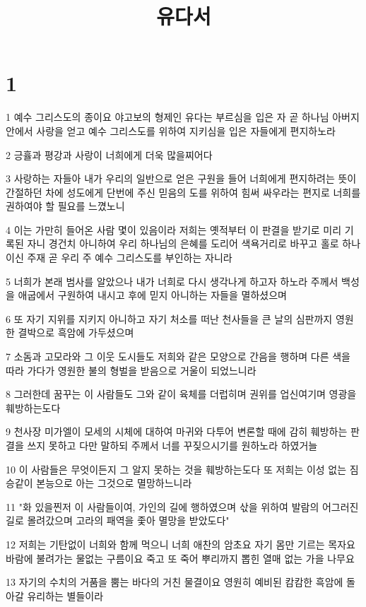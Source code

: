 

\title{유다서}


\chapter{1}

\par 1 예수 그리스도의 종이요 야고보의 형제인 유다는 부르심을 입은 자 곧 하나님 아버지 안에서 사랑을 얻고 예수 그리스도를 위하여 지키심을 입은 자들에게 편지하노라
\par 2 긍휼과 평강과 사랑이 너희에게 더욱 많을찌어다
\par 3 사랑하는 자들아 내가 우리의 일반으로 얻은 구원을 들어 너희에게 편지하려는 뜻이 간절하던 차에 성도에게 단번에 주신 믿음의 도를 위하여 힘써 싸우라는 편지로 너희를 권하여야 할 필요를 느꼈노니
\par 4 이는 가만히 들어온 사람 몇이 있음이라 저희는 옛적부터 이 판결을 받기로 미리 기록된 자니 경건치 아니하여 우리 하나님의 은혜를 도리어 색욕거리로 바꾸고 홀로 하나이신 주재 곧 우리 주 예수 그리스도를 부인하는 자니라
\par 5 너희가 본래 범사를 알았으나 내가 너희로 다시 생각나게 하고자 하노라 주께서 백성을 애굽에서 구원하여 내시고 후에 믿지 아니하는 자들을 멸하셨으며
\par 6 또 자기 지위를 지키지 아니하고 자기 처소를 떠난 천사들을 큰 날의 심판까지 영원한 결박으로 흑암에 가두셨으며
\par 7 소돔과 고모라와 그 이웃 도시들도 저희와 같은 모양으로 간음을 행하며 다른 색을 따라 가다가 영원한 불의 형벌을 받음으로 거울이 되었느니라
\par 8 그러한데 꿈꾸는 이 사람들도 그와 같이 육체를 더럽히며 권위를 업신여기며 영광을 훼방하는도다
\par 9 천사장 미가엘이 모세의 시체에 대하여 마귀와 다투어 변론할 때에 감히 훼방하는 판결을 쓰지 못하고 다만 말하되 주께서 너를 꾸짖으시기를 원하노라 하였거늘
\par 10 이 사람들은 무엇이든지 그 알지 못하는 것을 훼방하는도다 또 저희는 이성 없는 짐승같이 본능으로 아는 그것으로 멸망하느니라
\par 11 "화 있을찐저 이 사람들이여, 가인의 길에 행하였으며 삯을 위하여 발람의 어그러진 길로 몰려갔으며 고라의 패역을 좇아 멸망을 받았도다"
\par 12 저희는 기탄없이 너희와 함께 먹으니 너희 애찬의 암초요 자기 몸만 기르는 목자요 바람에 불려가는 물없는 구름이요 죽고 또 죽어 뿌리까지 뽑힌 열매 없는 가을 나무요
\par 13 자기의 수치의 거품을 뿜는 바다의 거친 물결이요 영원히 예비된 캄캄한 흑암에 돌아갈 유리하는 별들이라
